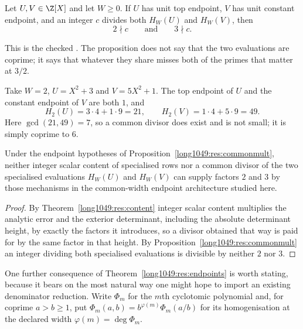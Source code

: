 \documentclass[11pt]{article}
\begin{document}
\begin{proposition}\label{long1049:res:commonmult}
Let \(U,V\in\Z[X]\) and let \(W\ge0\).  If \(U\) has unit top endpoint, \(V\)
has unit constant endpoint, and an integer
\(c\) divides both \(H_W(U)\) and \(H_W(V)\), then
\[
 2\nmid c\qquad\text{and}\qquad 3\nmid c.
\]
\end{proposition}

\noindent This is the checked
.  The proposition does not say that the two evaluations are coprime;
it says that whatever they share misses both of the primes that matter at
\(3/2\).

\begin{example}\label{long1049:ex:commonmult}
Take \(W=2\), \(U=X^2+3\) and \(V=5X^2+1\).  The top endpoint of \(U\) and the
constant endpoint of \(V\) are both \(1\), and
\[
 H_2(U)=3\cdot4+1\cdot9=21,\qquad H_2(V)=1\cdot4+5\cdot9=49 .
\]
Here \(\gcd(21,49)=7\), so a common divisor does exist and is not small; it
is simply coprime to \(6\).
\end{example}

\begin{corollary}\label{long1049:res:nomult}
Under the endpoint hypotheses of Proposition~\ref{long1049:res:commonmult}, neither
integer scalar content of specialised rows nor a common divisor of the two specialised
evaluations \(H_W(U)\) and \(H_W(V)\) can supply factors \(2\) and \(3\) by
those mechanisms in the common-width endpoint architecture studied here.
\end{corollary}

\begin{proof}
By Theorem~\ref{long1049:res:content} integer scalar content multiplies the analytic error and
the exterior determinant, including the absolute determinant height, by exactly
the factors it introduces, so a divisor obtained that way is paid for by the
same factor in that height.  By Proposition~\ref{long1049:res:commonmult} an integer
dividing both specialised evaluations is divisible by neither \(2\) nor \(3\).
\end{proof}

One further consequence of Theorem~\ref{long1049:res:endpoints} is worth stating,
because it bears on the most natural way one might hope to import an existing
denominator reduction.  Write $\Phi_m$ for the $m$th cyclotomic polynomial and,
for coprime $a>b\ge1$, put $\Phi_m(a,b)=b^{\varphi(m)}\Phi_m(a/b)$ for its
homogenisation at the declared width $\varphi(m)=\deg\Phi_m$.
\end{document}
